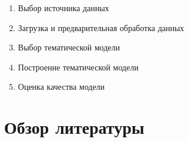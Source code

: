 \documentclass[a4paper]{report}
\begin{document}
	\begin{enumerate}
	\item{Выбор источника данных}
	\item{Загрузка и предварительная обработка данных}
	\item{Выбор тематической модели}
	\item{Построение тематической модели}
	\item{Оценка качества модели}
	\end{enumerate}

	\section{Обзор литературы}
	
\end{document}
